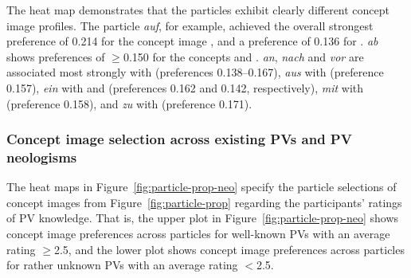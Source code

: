 \documentclass[output=paper]{langsci/langscibook}
\begin{document}
The heat map demonstrates that the particles exhibit clearly different
concept image profiles. The particle \textit{auf}, for example, achieved the
overall strongest preference of 0.214 for the concept image
, and a preference of 0.136 for
. \textit{ab} shows preferences of $\ge$0.150 for the
concepts  and . \textit{an},
\textit{nach} and \textit{vor} are associated most strongly with
 (preferences 0.138--0.167), \textit{aus} with
 (preference 0.157), \textit{ein} with
 and  (preferences 0.162 and
0.142, respectively), \textit{mit} with  (preference
0.158), and \textit{zu} with  (preference 0.171).

\subsubsection{Concept image selection across existing PVs and PV neologisms}

The heat maps in Figure~\ref{fig:particle-prop-neo} specify the
particle selections of concept images from Figure~\ref{fig:particle-prop}
regarding the participants' ratings of PV knowledge. That is, the
upper plot in Figure~\ref{fig:particle-prop-neo} shows concept image preferences
across particles for well-known PVs with an average rating $\ge$2.5,
and the lower plot shows concept image preferences across particles for rather
unknown PVs with an average rating $<$2.5.
\end{document}
